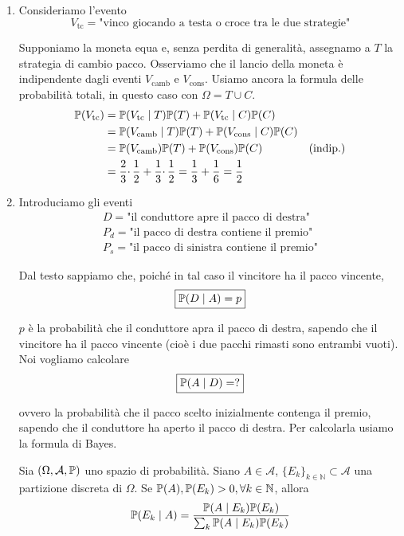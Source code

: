 \begin{enumerate}
\item Consideriamo l'evento
\begin{equation*}
V_{\text{tc}} =\text{"vinco giocando a testa o croce tra le due strategie"}
\end{equation*}

Supponiamo la moneta equa e, senza perdita di generalità, assegnamo a $T$ la strategia di cambio pacco. Osserviamo che il lancio della moneta è indipendente dagli eventi $V_{\text{camb}}$ e $V_{\text{cons}}$. Usiamo ancora la formula delle probabilità totali, in questo caso con $\Omega =T\cup C$.\begin{align*}
\mathbb{P}( V_{\text{tc}}) & =\mathbb{P}( V_{\text{tc}} \mid T)\mathbb{P}( T) +\mathbb{P}( V_{\text{tc}} \mid C)\mathbb{P}( C) & \\
 & =\mathbb{P}( V_{\text{camb}} \mid T)\mathbb{P}( T) +\mathbb{P}( V_{\text{cons}} \mid C)\mathbb{P}( C) & \\
 & =\mathbb{P}( V_{\text{camb}})\mathbb{P}( T) +\mathbb{P}( V_{\text{cons}})\mathbb{P}( C) & \text{(indip.)}\\
 & =\frac{2}{3} \cdotp \frac{1}{2} +\frac{1}{3} \cdotp \frac{1}{2} =\frac{1}{3} +\frac{1}{6} =\frac{1}{2} & 
\end{align*}
\item Introduciamo gli eventi
\begin{gather*}
D=\text{"il conduttore apre il pacco di destra"}\\
P_{d} =\text{"il pacco di destra contiene il premio"}\\
P_{s} =\text{"il pacco di sinistra contiene il premio"}
\end{gather*}

Dal testo sappiamo che, poiché in tal caso il vincitore ha il pacco vincente,\begin{equation*}
\boxed{\mathbb{P}( D\mid A) =p}
\end{equation*}

$p$ è la probabilità che il conduttore apra il pacco di destra, sapendo che il vincitore ha il pacco vincente (cioè i due pacchi rimasti sono entrambi vuoti). Noi vogliamo calcolare
\begin{equation*}
\boxed{\mathbb{P}( A\mid D) =?}
\end{equation*}

ovvero la probabilità che il pacco scelto inizialmente contenga il premio, sapendo che il conduttore ha aperto il pacco di destra. Per calcolarla usiamo la formula di Bayes.

\begin{theorem}
Sia $( \Omega ,\mathcal{A} ,\mathbb{P})$ uno spazio di probabilità. Siano $A\in \mathcal{A}$, $\{E_{k}\}_{k\in \mathbb{N}} \subset \mathcal{A}$ una partizione discreta di $\Omega $. Se $\mathbb{P}( A) ,\mathbb{P}( E_{k})  >0,\forall k\in \mathbb{N}$, allora
\begin{equation*}
\mathbb{P}( E_{k} \mid A) =\frac{\mathbb{P}( A\mid E_{k})\mathbb{P}( E_{k})}{\sum_{k}\mathbb{P}( A\mid E_{k})\mathbb{P}( E_{k})}
\end{equation*}
\end{theorem}


\end{enumerate}
